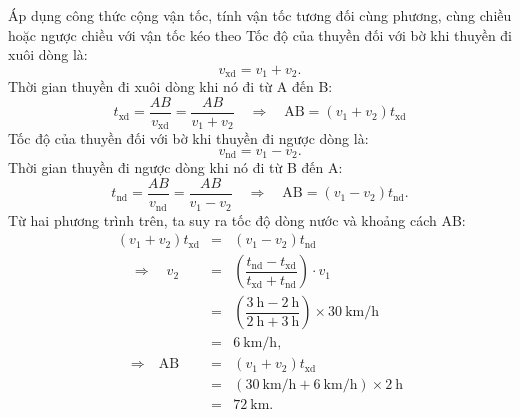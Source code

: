 \begin{dang}{Áp dụng công thức cộng vận tốc, tính vận tốc tương đối cùng phương, cùng chiều hoặc ngược chiều với vận tốc kéo theo}
{{		Tốc độ của thuyền đối với bờ khi thuyền đi xuôi dòng là:
		$$v_{\text{xd}}=v_1+v_2.$$
		Thời gian thuyền đi xuôi dòng khi nó đi từ A đến B:
		\begin{equation*}
			t_{\text{xd}}=\dfrac{AB}{v_{\text{xd}}}= \dfrac{AB}{v_1+v_2}\quad \Rightarrow\quad \text{AB}=(v_1+v_2)t_{\text{xd}}
		\end{equation*}
		Tốc độ của thuyền đối với bờ khi thuyền đi ngược dòng là:
		$$v_{\text{nd}}=v_1-v_2.$$
		Thời gian thuyền đi ngược dòng khi nó đi từ B đến A:
		\begin{equation*}
			t_{\text{nd}}=\dfrac{AB}{v_{\text{nd}}}= \dfrac{AB}{v_1-v_2}\quad\Rightarrow\quad \text{AB}=(v_1-v_2)t_\text{nd}.
		\end{equation*}
		Từ hai phương trình trên, ta suy ra tốc độ dòng nước và khoảng cách AB:
		\begin{eqnarray*}
			(v_1+v_2)t_{\text{xd}}&=&(v_1-v_2)t_{\text{nd}}\\
			\quad\Rightarrow\quad	v_2&=&\left(\dfrac{t_\text{nd}-t_\text{xd}}{t_{\text{xd}}+t_\text{nd}}\right)\cdot v_1\\
			&=&\left(\dfrac{\SI{3}{\hour}-\SI{2}{\hour}}{\SI{2}{\hour}+\SI{3}{\hour}}\right)\times\SI{30}{\kilo\meter/\hour}\\
			&=&\SI{6}{\kilo\meter/\hour},\\
			\quad\Rightarrow\quad \text{AB}&=&(v_1+v_2)t_\text{xd}\\
			&=&(\SI{30}{\kilo\meter/\hour}+\SI{6}{\kilo\meter/\hour})\times\SI{2}{\hour}\\
			&=&\SI{72}{\kilo\meter}.
		\end{eqnarray*}
	}}
\end{dang}